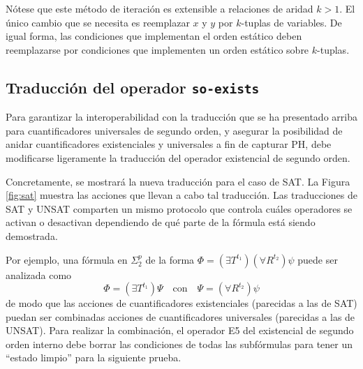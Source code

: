 Nótese que este método de iteración es extensible a relaciones de aridad $k>1$.
El único cambio que se necesita es reemplazar $x$ y $y$ por $k$-tuplas de
variables. De igual forma, las condiciones que implementan el orden estático
deben reemplazarse por condiciones que implementen un orden estático sobre
$k$-tuplas.

\subsection{Traducción del operador \texttt{so-exists}}
Para garantizar la interoperabilidad con la traducción que se ha presentado arriba
para cuantificadores universales de segundo orden, y asegurar la posibilidad de anidar
cuantificadores existenciales y universales a fin de capturar PH,
debe modificarse ligeramente la traducción del operador existencial de segundo orden.

Concretamente, se mostrará la nueva traducción para el caso de SAT.
La Figura \ref{fig:sat} muestra las acciones que llevan a
cabo tal traducción.
Las traducciones de SAT y UNSAT comparten un mismo protocolo que controla
cuáles operadores se activan o desactivan dependiendo de qué parte de la
fórmula está siendo demostrada.

Por ejemplo, una fórmula en $\Sigma^p_2$ de la forma
$\Phi=(\exists T^{t_1})(\forall R^{t_2})\psi$ puede ser analizada como
\begin{equation}
\Phi = (\exists T^{t_1})\Psi \quad\text{con}\quad \Psi = (\forall R^{t_2})\psi
\end{equation}
de modo que las acciones de cuantificadores existenciales (parecidas a las de
SAT) puedan ser combinadas acciones de cuantificadores universales (parecidas a
las de UNSAT). Para realizar la combinación, el operador E5 del existencial de
segundo orden interno debe borrar las condiciones de todas las subfórmulas para
tener un ``estado limpio'' para la siguiente prueba.


